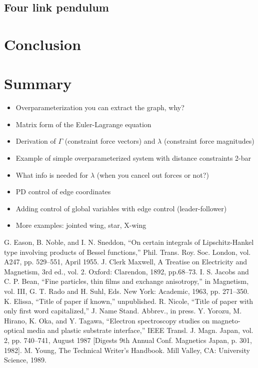\documentclass[conference]{IEEEtran}
\begin{document}
\subsection{Four link pendulum}

\section{Conclusion}

\section{Summary}
\begin{itemize}
    \item Overparameterization you can extract the graph, why?
    \item Matrix form of the Euler-Lagrange equation
    \item Derivation of $\Gamma$ (constraint force vectors) and $\lambda$ (constraint force magnitudes)
    \item Example of simple overparameterized system with distance constraints 2-bar
    \item What info is needed for $\lambda$ (when you cancel out forces or not?)
    \item PD control of edge coordinates
    \item Adding control of global variables with edge control (leader-follower)
    \item More examples: jointed wing, star, X-wing
\end{itemize}

\begin{thebibliography}{00}
 G. Eason, B. Noble, and I. N. Sneddon, ``On certain integrals of Lipschitz-Hankel type involving products of Bessel functions,'' Phil. Trans. Roy. Soc. London, vol. A247, pp. 529--551, April 1955.
 J. Clerk Maxwell, A Treatise on Electricity and Magnetism, 3rd ed., vol. 2. Oxford: Clarendon, 1892, pp.68--73.
 I. S. Jacobs and C. P. Bean, ``Fine particles, thin films and exchange anisotropy,'' in Magnetism, vol. III, G. T. Rado and H. Suhl, Eds. New York: Academic, 1963, pp. 271--350.
 K. Elissa, ``Title of paper if known,'' unpublished.
 R. Nicole, ``Title of paper with only first word capitalized,'' J. Name Stand. Abbrev., in press.
 Y. Yorozu, M. Hirano, K. Oka, and Y. Tagawa, ``Electron spectroscopy studies on magneto-optical media and plastic substrate interface,'' IEEE Transl. J. Magn. Japan, vol. 2, pp. 740--741, August 1987 [Digests 9th Annual Conf. Magnetics Japan, p. 301, 1982].
 M. Young, The Technical Writer's Handbook. Mill Valley, CA: University Science, 1989.
\end{thebibliography}
\end{document}
